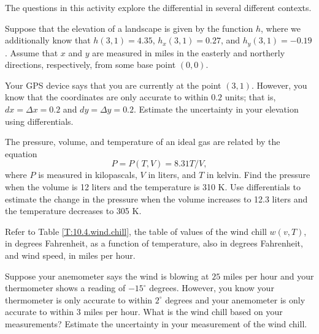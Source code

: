 \begin{activity} \label{A:10.4.12} The questions in this activity explore the differential in several different contexts.
\ba
\item Suppose that the elevation of a landscape is given by the
  function $h$, where we additionally know that $h(3,1) = 4.35$, $h_x(3,1) = 0.27$, and $h_y(3,1) = -0.19$.  Assume that $x$ and $y$ are measured in miles in the easterly and northerly directions, respectively, from some base point $(0,0)$.

  Your GPS device says that you are currently at the point $(3,1)$.
  However, you know that the coordinates are only accurate to within
  $0.2$ units; that is, $dx = \Delta x = 0.2$ and $dy= \Delta y =
  0.2$.  Estimate the uncertainty in your elevation using differentials.

\item The pressure, volume, and temperature of an ideal gas are
  related by the equation 
  $$
  P= P(T,V) = 8.31 T/V,
  $$
  where $P$ is measured in kilopascals, $V$ in liters, and $T$ in
  kelvin.  Find the pressure when the volume is 12 liters and the
  temperature is 310 K.  Use differentials to estimate the change
  in the pressure when the volume increases to 12.3 liters and the
  temperature decreases to 305 K.

\item Refer to Table \ref{T:10.4.wind.chill}, the table of
  values of the wind chill $w(v,T)$, in degrees Fahrenheit, as a
  function of temperature, also in degrees Fahrenheit, and 
  wind speed, in miles per hour.  
  
  Suppose your anemometer says the wind is blowing at $25$ miles per hour and your thermometer shows a reading of $-15^\circ$ degrees.
  However, you know your thermometer is only accurate to within
  $2^\circ$ degrees and your anemometer is only accurate to within $3$
  miles per hour.  What is the wind chill based on your measurements?
  Estimate the uncertainty in your measurement of the wind chill.

\ea

\end{activity}

